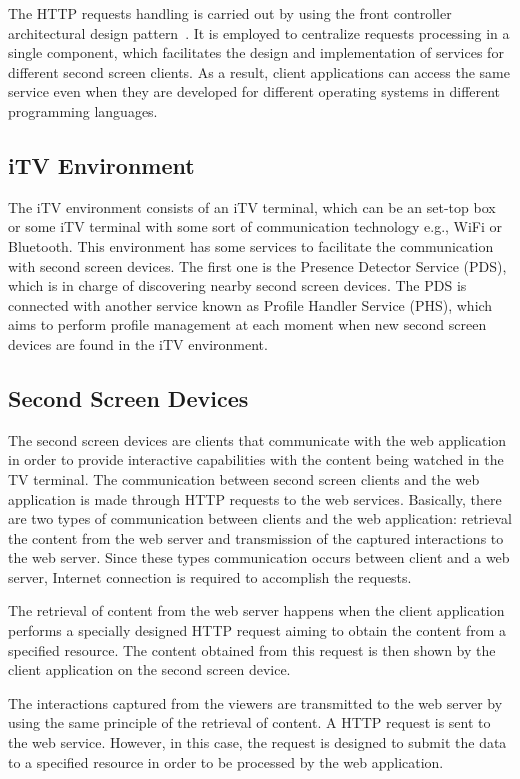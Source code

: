 \documentclass[journal]{IEEEtran}
\begin{document}
The HTTP requests handling is carried out by using the front controller architectural design pattern~\cite{Buschmann2007}. It is employed to centralize requests processing in a single component, which facilitates the design and implementation of services for different second screen clients. As a result, client applications can access the same service even when they are developed for different operating systems in different programming languages.

\subsection{iTV Environment}

The iTV environment consists of an iTV terminal, which can be an set-top box or some iTV terminal with some sort of communication technology e.g., WiFi or Bluetooth. This environment has some services to facilitate the communication with second screen devices. The first one is the Presence Detector Service (PDS), which is in charge of discovering nearby second screen devices. The PDS is connected with another service known as Profile Handler Service (PHS), which aims to perform profile management at each moment when new second screen devices are found in the iTV environment.

\subsection{Second Screen Devices}

The second screen devices are clients that communicate with the web application in order to provide interactive capabilities with the content being watched in the TV terminal. The communication between second screen clients and the web application is made through HTTP requests to the web services. Basically, there are two types of communication between clients and the web application: retrieval the content from the web server and transmission of the captured interactions to the web server. Since these types communication occurs between client and a web server, Internet connection is required to accomplish the requests.

The retrieval of content from the web server happens when the client application performs a specially designed HTTP request aiming to obtain the content from a specified resource. The content obtained from this request is then shown by the client application on the second screen device.

The interactions captured from the viewers are transmitted to the web server by using the same principle of the retrieval of content. A HTTP request is sent to the web service. However, in this case, the request is designed to submit the data to a specified resource in order to be processed by the web application.
\end{document}
